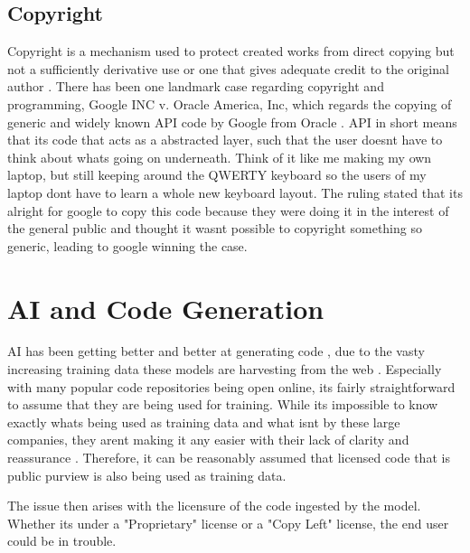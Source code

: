 \documentclass[journal]{IEEEtran}
\begin{document}
\subsection{Copyright}

Copyright is a mechanism used to protect created works from direct copying
but not a sufficiently derivative use or one that gives adequate credit to
the original author \cite[p.~55]{stokes2021}. There has been one landmark
case regarding copyright and programming, Google INC v. Oracle America, Inc,
which regards the copying of generic and widely known API code by Google
from Oracle \cite{harvard}. API in short means that its code that acts as a
abstracted layer, such that the user doesnt have to think about whats going
on underneath. Think of it like me making my own laptop, but still keeping
around the QWERTY keyboard so the users of my laptop dont have to learn a
whole new keyboard layout. The ruling stated that its alright for google to
copy this code because they were doing it in the interest of the general
public and thought it wasnt possible to copyright something so generic,
leading to google winning the case.




\section{AI and Code Generation}

AI has been getting better and better at generating
code \cite{codesignal}, due to the vasty increasing training data
these models are harvesting from the web \cite{lacour_2024}.
Especially with many popular code repositories being open online,
its fairly straightforward to assume that they are being used for training.
While its impossible to know exactly whats being used as training data and
what isnt by these large companies, they arent making it any easier with their
lack of clarity and reassurance \cite{willison_2023}. Therefore, it can be
reasonably assumed that licensed code that is public purview is also
being used as training data.


The issue then arises with the licensure of the code ingested by the model.
Whether its under a "Proprietary" license or a "Copy Left" license, the
end user could be in trouble.
\end{document}

